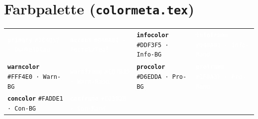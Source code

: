 \documentclass[a4paper, 11pt, ngerman]{article}
\begin{document}
\vspace{0.55em}

\section*{Farbpalette (\texttt{colormeta.tex})}

\begin{tcolorbox}[cs, title={Alle definierten Farben — nur \texttt{colormeta.tex} anpassen}]
\renewcommand{\arraystretch}{2.2}
\setlength{\tabcolsep}{4pt}
\begin{tabular}{@{} p{3.55cm} p{3.55cm} p{3.55cm} p{3.55cm} @{}}
  \cellcolor{primary}\textcolor{white}{\texttt{\textbf{primary}}}%
    \newline\textcolor{white}{\scriptsize\texttt{\#2E4057 · Dunkelblau}} &
  \cellcolor{accent}\textcolor{white}{\texttt{\textbf{accent}}}%
    \newline\textcolor{white}{\scriptsize\texttt{\#048A81 · Petrol/Teal}} &
  \cellcolor{infocolor}\textcolor{primary}{\texttt{\textbf{infocolor}}}%
    \newline\textcolor{primary}{\scriptsize\texttt{\#DDF3F5 · Info-BG}} &
  \cellcolor{infoframe}\textcolor{white}{\texttt{\textbf{infoframe}}}%
    \newline\textcolor{white}{\scriptsize\texttt{\#048A81 · Info-Rand}}
  \\
  \cellcolor{warncolor}\textcolor{primary}{\texttt{\textbf{warncolor}}}%
    \newline\textcolor{primary}{\scriptsize\texttt{\#FFF4E0 · Warn-BG}} &
  \cellcolor{warnframe}\textcolor{white}{\texttt{\textbf{warnframe}}}%
    \newline\textcolor{white}{\scriptsize\texttt{\#E07B39 · Warn-Rand}} &
  \cellcolor{procolor}\textcolor{primary}{\texttt{\textbf{procolor}}}%
    \newline\textcolor{primary}{\scriptsize\texttt{\#D6EDDA · Pro-BG}} &
  \cellcolor{proframe}\textcolor{white}{\texttt{\textbf{proframe}}}%
    \newline\textcolor{white}{\scriptsize\texttt{\#1E8A3F · Pro-Rand}}
  \\
  \cellcolor{concolor}\textcolor{primary}{\texttt{\textbf{concolor}}}%
    \newline\textcolor{primary}{\scriptsize\texttt{\#FADDE1 · Con-BG}} &
  \cellcolor{conframe}\textcolor{white}{\texttt{\textbf{conframe}}}%
    \newline\textcolor{white}{\scriptsize\texttt{\#C0392B · Con-Rand}} &

\end{tabular}
\end{tcolorbox}
\end{document}
